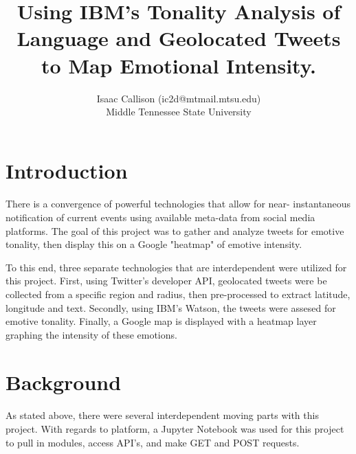 \documentclass[12pt, oneside]{article}
\title{Using IBM's Tonality Analysis of Language and Geolocated Tweets to Map Emotional Intensity.
\\\medskip}
\author{Isaac Callison (ic2d@mtmail.mtsu.edu)\\Middle Tennessee State University}
\begin{document}
\maketitle
\nocite{*}
\newpage{}


\renewenvironment{abstract}
 {\small
  \begin{center}
  \bfseries \abstractname\vspace{-.5em}\vspace{0pt}
  \end{center}
  \list{}{
    \setlength{\leftmargin}{.8cm}%
    \setlength{\rightmargin}{\leftmargin}%
  }%
  \item\relax}
 {\endlist}

\begin{abstract}

\end{abstract}



\section{Introduction}
\paragraph{}
There is a convergence of powerful technologies that allow for near-
instantaneous notification of current events using available meta-data from
social media platforms. The goal of this project was to gather and analyze
tweets for emotive tonality, then display this on a Google "heatmap" of emotive
intensity.

To this end, three separate technologies that are interdependent were utilized
for this project. First, using Twitter's developer API, geolocated tweets were be collected from a specific region and radius, then pre-processed to extract
latitude, longitude and text. Secondly, using IBM's Watson, the tweets were
assesed for emotive tonality. Finally, a Google map is displayed with a
heatmap layer graphing the intensity of these emotions.


\section{Background}
\paragraph{}
As stated above, there were several interdependent moving parts with this
project. With regards to platform, a Jupyter Notebook was used for this
project to pull in modules, access API's, and make GET and POST requests.
\end{document}
